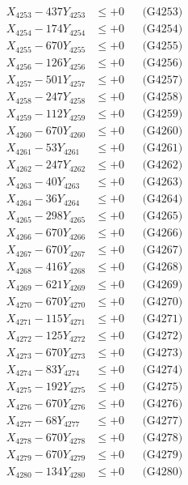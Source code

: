 \documentclass[a4paper,10pt]{article}
\begin{document}
{\begin{align}
X_{4253} - 437Y_{4253} &\leq +0 && \text{(G4253)} \\
X_{4254} - 174Y_{4254} &\leq +0 && \text{(G4254)} \\
X_{4255} - 670Y_{4255} &\leq +0 && \text{(G4255)} \\
X_{4256} - 126Y_{4256} &\leq +0 && \text{(G4256)} \\
X_{4257} - 501Y_{4257} &\leq +0 && \text{(G4257)} \\
X_{4258} - 247Y_{4258} &\leq +0 && \text{(G4258)} \\
X_{4259} - 112Y_{4259} &\leq +0 && \text{(G4259)} \\
X_{4260} - 670Y_{4260} &\leq +0 && \text{(G4260)} \\
\allowbreak
X_{4261} - 53Y_{4261} &\leq +0 && \text{(G4261)} \\
X_{4262} - 247Y_{4262} &\leq +0 && \text{(G4262)} \\
X_{4263} - 40Y_{4263} &\leq +0 && \text{(G4263)} \\
X_{4264} - 36Y_{4264} &\leq +0 && \text{(G4264)} \\
X_{4265} - 298Y_{4265} &\leq +0 && \text{(G4265)} \\
X_{4266} - 670Y_{4266} &\leq +0 && \text{(G4266)} \\
X_{4267} - 670Y_{4267} &\leq +0 && \text{(G4267)} \\
X_{4268} - 416Y_{4268} &\leq +0 && \text{(G4268)} \\
X_{4269} - 621Y_{4269} &\leq +0 && \text{(G4269)} \\
X_{4270} - 670Y_{4270} &\leq +0 && \text{(G4270)} \\
\allowbreak
X_{4271} - 115Y_{4271} &\leq +0 && \text{(G4271)} \\
X_{4272} - 125Y_{4272} &\leq +0 && \text{(G4272)} \\
X_{4273} - 670Y_{4273} &\leq +0 && \text{(G4273)} \\
X_{4274} - 83Y_{4274} &\leq +0 && \text{(G4274)} \\
X_{4275} - 192Y_{4275} &\leq +0 && \text{(G4275)} \\
X_{4276} - 670Y_{4276} &\leq +0 && \text{(G4276)} \\
X_{4277} - 68Y_{4277} &\leq +0 && \text{(G4277)} \\
X_{4278} - 670Y_{4278} &\leq +0 && \text{(G4278)} \\
X_{4279} - 670Y_{4279} &\leq +0 && \text{(G4279)} \\
X_{4280} - 134Y_{4280} &\leq +0 && \text{(G4280)} \\

\end{align}}
\end{document}
